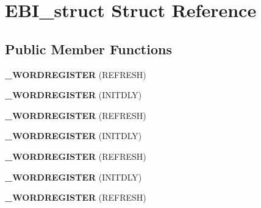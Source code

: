 \hypertarget{struct_e_b_i__struct}{}\section{E\+B\+I\+\_\+struct Struct Reference}
\label{struct_e_b_i__struct}
\subsection*{Public Member Functions}
\begin{DoxyCompactItemize}
\item 
{\bfseries \+\_\+\+W\+O\+R\+D\+R\+E\+G\+I\+S\+T\+ER} (R\+E\+F\+R\+E\+SH)\hypertarget{struct_e_b_i__struct_a8e9b2a3d2c3a1a909cb04b3a836e9e56}{}\label{struct_e_b_i__struct_a8e9b2a3d2c3a1a909cb04b3a836e9e56}

\item 
{\bfseries \+\_\+\+W\+O\+R\+D\+R\+E\+G\+I\+S\+T\+ER} (I\+N\+I\+T\+D\+LY)\hypertarget{struct_e_b_i__struct_ad1692132eee654eed052947efd91836d}{}\label{struct_e_b_i__struct_ad1692132eee654eed052947efd91836d}

\item 
{\bfseries \+\_\+\+W\+O\+R\+D\+R\+E\+G\+I\+S\+T\+ER} (R\+E\+F\+R\+E\+SH)\hypertarget{struct_e_b_i__struct_a8e9b2a3d2c3a1a909cb04b3a836e9e56}{}\label{struct_e_b_i__struct_a8e9b2a3d2c3a1a909cb04b3a836e9e56}

\item 
{\bfseries \+\_\+\+W\+O\+R\+D\+R\+E\+G\+I\+S\+T\+ER} (I\+N\+I\+T\+D\+LY)\hypertarget{struct_e_b_i__struct_ad1692132eee654eed052947efd91836d}{}\label{struct_e_b_i__struct_ad1692132eee654eed052947efd91836d}

\item 
{\bfseries \+\_\+\+W\+O\+R\+D\+R\+E\+G\+I\+S\+T\+ER} (R\+E\+F\+R\+E\+SH)\hypertarget{struct_e_b_i__struct_a8e9b2a3d2c3a1a909cb04b3a836e9e56}{}\label{struct_e_b_i__struct_a8e9b2a3d2c3a1a909cb04b3a836e9e56}

\item 
{\bfseries \+\_\+\+W\+O\+R\+D\+R\+E\+G\+I\+S\+T\+ER} (I\+N\+I\+T\+D\+LY)\hypertarget{struct_e_b_i__struct_ad1692132eee654eed052947efd91836d}{}\label{struct_e_b_i__struct_ad1692132eee654eed052947efd91836d}

\item 
{\bfseries \+\_\+\+W\+O\+R\+D\+R\+E\+G\+I\+S\+T\+ER} (R\+E\+F\+R\+E\+SH)\hypertarget{struct_e_b_i__struct_a8e9b2a3d2c3a1a909cb04b3a836e9e56}{}\label{struct_e_b_i__struct_a8e9b2a3d2c3a1a909cb04b3a836e9e56}


\end{DoxyCompactItemize}
